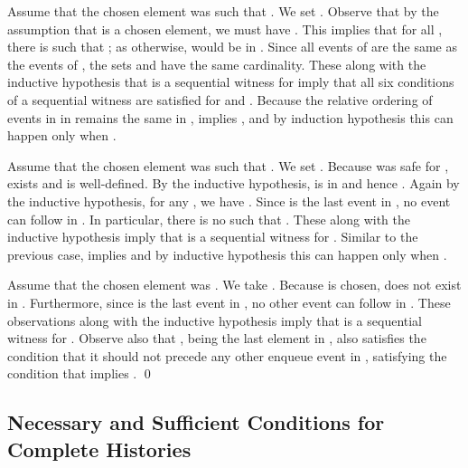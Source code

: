 \documentclass{LMCS}
\begin{document}
Assume that the chosen element was  such that .
We set .
Observe that by the assumption that  is a chosen element, we must have .
This implies that for all , there is  such that ; as otherwise,  would be in .
Since all events of  are the same as the events of , the sets  and  have the same cardinality.
These along with the inductive hypothesis that  is a sequential witness for  imply that all six conditions of a sequential witness are satisfied for  and .
Because the relative ordering of events in  in  remains the same in ,  implies , and by induction hypothesis this can happen only when .

Assume that the chosen element was  such that . 
We set .
Because  was safe for ,  exists and  is well-defined.
By the inductive hypothesis,  is in  and hence .
Again by the inductive hypothesis, for any , we have .
Since  is the last event in , no event can follow  in .
In particular, there is no  such that . 
These along with the inductive hypothesis imply that  is a sequential witness for .
Similar to the previous case,  implies  and by inductive hypothesis this can happen only when .

Assume that the chosen element was .
We take .
Because  is chosen,  does not exist in .
Furthermore, since  is the last event in , no other event can follow  in .
These observations along with the inductive hypothesis imply that  is a sequential witness for .
Observe also that , being the last element in , also satisfies the condition that it should not precede any other enqueue event in , satisfying the condition that  implies .
\qed


\subsection*{Necessary and Sufficient Conditions for Complete Histories}
\end{document}
